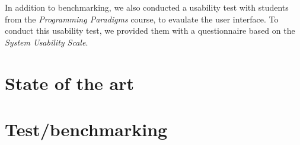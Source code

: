 In addition to benchmarking, we also conducted a usability test with students from the \textit{Programming Paradigms} course, to evaulate the user interface. To conduct this usability test, we provided them with a questionnaire based on the \textit{System Usability Scale}. 
 







\section{State of the art}

\section{Test/benchmarking}








